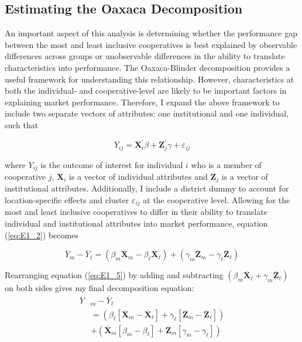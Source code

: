 \documentclass[11pt]{article}
\begin{document}
\subsection{Estimating the Oaxaca Decomposition} \label{sec:E1_est}

An important aspect of this analysis is determining whether the performance gap between the most and least inclusive cooperatives is best explained by observable differences across groups or unobservable differences in the ability to translate characteristics into performance. The Oaxaca-Blinder decomposition provides a useful framework for understanding this relationship. However, characteristics at both the individual- and cooperative-level are likely to be important factors in explaining market performance. Therefore, I expand the above framework to include two separate vectors of attributes: one institutional and one individual, such that

\begin{equation} \label{eq:E1_4}
   Y_{ij} = \mathbf{X}_i^{\prime}\beta + \mathbf{Z}_j^{\prime}\gamma + \varepsilon_{ij}
\end{equation}  

where $Y_{ij}$ is the outcome of interest for individual $i$ who is a member of cooperative $j$, $\mathbf{X}_i$ is a vector of individual attributes and $\mathbf{Z}_j$ is a vector of institutional attributes. Additionally, I include a district dummy to account for location-specific effects and cluster $\varepsilon_{ij}$ at the cooperative level. Allowing for the most and least inclusive cooperatives to differ in their ability to translate individual and institutional attributes into market performance, equation (\ref{eq:E1_2}) becomes

\begin{equation} \label{eq:E1_5}
        \overline{Y}_{m} - \overline{Y}_{\ell} =  (\beta_{m}\overline{\mathbf{X}}_{m} - \beta_{\ell}\overline{\mathbf{X}}_{\ell}) + (\gamma_{m}\overline{\mathbf{Z}}_{m} - \gamma_{\ell}\overline{\mathbf{Z}}_{\ell})
\end{equation}  

Rearranging equation (\ref{eq:E1_5}) by adding and subtracting $(\beta_{m}\overline{\mathbf{X}}_{\ell} + \gamma_{m}\overline{\mathbf{Z}}_{\ell})$ on both sides gives my final decomposition equation:
\begin{subequations}
    \begin{align}
        \overline{Y}&_{m} - \overline{Y}_{\ell} \label{eq:E1_6a} \\
        &= (\beta_{\ell}[\overline{\mathbf{X}}_{m} - \overline{\mathbf{X}}_{\ell}] + \gamma_{\ell}[\overline{\mathbf{Z}}_{m} - \overline{\mathbf{Z}}_{\ell}]) \label{eq:E1_6b} \\
        &+ (\overline{\mathbf{X}}_{m}[\beta_{m} - \beta_{\ell}] + \overline{\mathbf{Z}}_{m}[\gamma_{m} - \gamma_{\ell}]) \label{eq:E1_6c}
    \end{align}
\end{subequations}  
\end{document}
